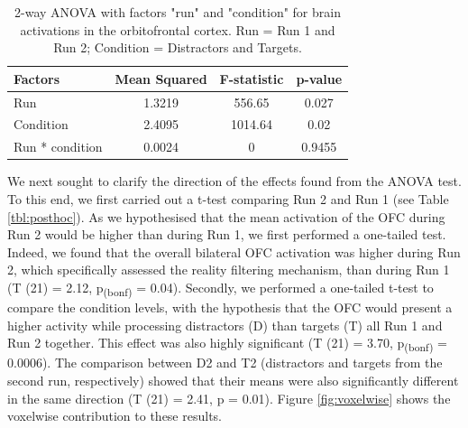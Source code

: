 \begin{table}
\vspace{20px}
\begin{center}
\begin{tabular}{ ||l||c c c|| } 

  \hline
\rowcolor{BabyBlue}
Factors & Mean Squared & F-statistic & p-value\\
  \hline
  \hline
Run   & 1.3219 & 556.65 & 0.027 \\ 
  \hline
Condition  & 2.4095   & 1014.64 & 0.02 \\ 
  \hline
Run * condition  & 0.0024 & 0 & 0.9455 \\ 

 \hline
\end{tabular}

\end{center}
\caption{2-way ANOVA with factors "run" and "condition" for brain activations in the orbitofrontal cortex. Run = Run 1 and Run 2; Condition = Distractors and Targets. } \label{tbl:anova}
\end{table}


We next sought to clarify the direction of the effects found from the ANOVA test. To this end, we first carried out a t-test comparing Run 2 and Run 1 (see Table \ref{tbl:posthoc}). As we hypothesised that the mean activation of the OFC during Run 2 would be higher than during Run 1, we first performed a one-tailed test. Indeed, we found that the overall bilateral OFC activation was higher during Run 2, which specifically assessed the reality filtering mechanism, than during Run 1 (T (21) = 2.12, p\textsubscript{(bonf)} = 0.04). Secondly, we performed a one-tailed t-test to compare the condition levels, with the hypothesis that the OFC would present a higher activity while processing distractors (D) than targets (T) all Run 1 and Run 2 together. This effect was also highly significant (T (21) = 3.70, p\textsubscript{(bonf)} = 0.0006). The comparison between D2 and T2 (distractors and targets from the second run, respectively) showed that their means were also significantly different in the same direction (T (21) = 2.41, p = 0.01). Figure \ref{fig:voxelwise} shows the voxelwise contribution to these results. 



